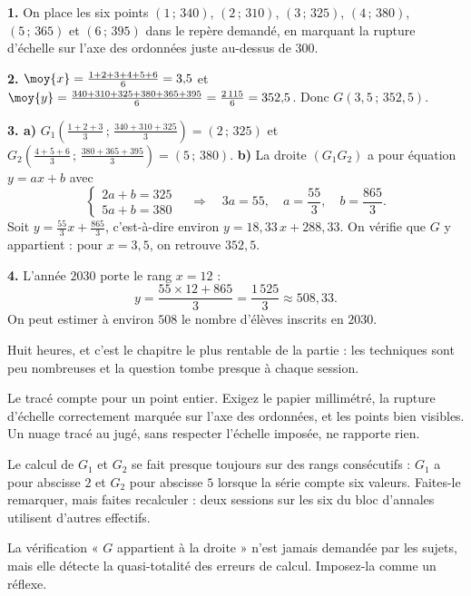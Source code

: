 \begin{corrige}
\textbf{1.} On place les six points $(1\,;\,340)$, $(2\,;\,310)$,
$(3\,;\,325)$, $(4\,;\,380)$, $(5\,;\,365)$ et $(6\,;\,395)$ dans le repère
demandé, en marquant la rupture d'échelle sur l'axe des ordonnées juste
au-dessus de $300$.

\textbf{2.} $\moy{x} = \frac{1+2+3+4+5+6}{6} = 3{,}5$ et
$\moy{y} = \frac{340+310+325+380+365+395}{6} = \frac{2\,115}{6} = 352{,}5$.
Donc $G(3{,}5\,;\,352{,}5)$.

\textbf{3. a)} $G_{1}\left(\frac{1+2+3}{3}\,;\,\frac{340+310+325}{3}\right)
= (2\,;\,325)$ et
$G_{2}\left(\frac{4+5+6}{3}\,;\,\frac{380+365+395}{3}\right)
= (5\,;\,380)$.
\textbf{b)} La droite $\left(G_{1}G_{2}\right)$ a pour équation
$y = ax+b$ avec
\[
  \begin{cases} 2a+b = 325\\ 5a+b = 380 \end{cases}
  \quad\Longrightarrow\quad
  3a = 55, \quad a = \frac{55}{3}, \quad b = \frac{865}{3}.
\]
Soit $y = \frac{55}{3}x+\frac{865}{3}$, c'est-à-dire environ
$y = 18{,}33\,x+288{,}33$.
On vérifie que $G$ y appartient : pour $x = 3{,}5$, on retrouve $352{,}5$.

\textbf{4.} L'année $2030$ porte le rang $x = 12$ :
\[
  y = \frac{55\times12+865}{3} = \frac{1\,525}{3} \approx 508{,}33 .
\]
On peut estimer à environ $508$ le nombre d'élèves inscrits en $2030$.
\end{corrige}

\begin{notepourlaclasse}
Huit heures, et c'est le chapitre le plus rentable de la partie : les
techniques sont peu nombreuses et la question tombe presque à chaque
session.

Le tracé compte pour un point entier. Exigez le papier millimétré, la
rupture d'échelle correctement marquée sur l'axe des ordonnées, et les
points bien visibles. Un nuage tracé au jugé, sans respecter l'échelle
imposée, ne rapporte rien.

Le calcul de $G_{1}$ et $G_{2}$ se fait presque toujours sur des rangs
consécutifs : $G_{1}$ a pour abscisse $2$ et $G_{2}$ pour abscisse $5$
lorsque la série compte six valeurs. Faites-le remarquer, mais faites
recalculer : deux sessions sur les six du bloc d'annales utilisent d'autres
effectifs.

La vérification « $G$ appartient à la droite » n'est jamais demandée par les
sujets, mais elle détecte la quasi-totalité des erreurs de calcul. Imposez-la
comme un réflexe.
\end{notepourlaclasse}

